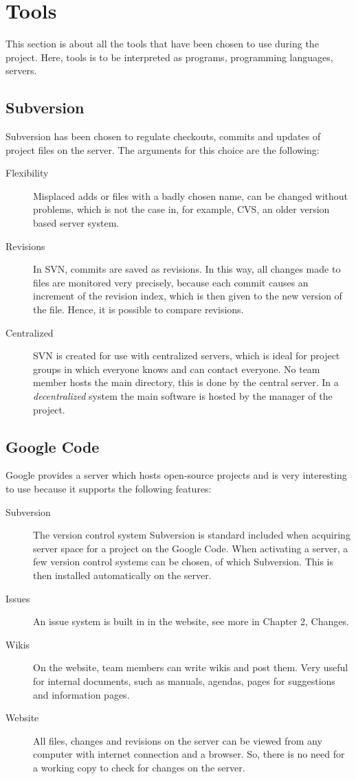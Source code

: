 \section{Tools}
This section is about all the tools that have been chosen to use during the project. Here, tools is to be interpreted as programs, programming languages, servers.

\subsection{Subversion}
Subversion has been chosen to regulate checkouts, commits and updates of project files on the server.
The arguments for this choice are the following:
\begin{description}
\item[Flexibility]
Misplaced adds or files with a badly chosen name, can be changed without problems, which is not the case in, for example, CVS, an older version based server system.
\item[Revisions]
In SVN, commits are saved as revisions.
In this way, all changes made to files are monitored very precisely, because each commit causes an increment of the revision index, which is then given to the new version of the file.
Hence, it is possible to compare revisions.
\item[Centralized]
SVN is created for use with centralized servers, which is ideal for project groups in which everyone knows and can contact everyone.
No team member hosts the main directory, this is done by the central server.
In a {\it decentralized} system the main software is hosted by the manager of the project.
\end{description}

\subsection{Google Code}
Google provides a server which hosts open-source projects and is very interesting to use because it supports the following features:
\begin{description}
\item[Subversion]
The version control system Subversion is standard included when acquiring server space for a project on the Google Code. When activating a server, a few version control systems can be chosen, of which Subversion. This is then installed automatically on the server.
\item[Issues]
An issue system is built in in the website, see more in Chapter 2, Changes.
\item[Wikis]
On the website, team members can write wikis and post them. Very useful for internal documents, such as manuals, agendas, pages for suggestions and information pages.
\item[Website]
All files, changes and revisions on the server can be viewed from any computer with internet connection and a browser. So, there is no need for a working copy to check for changes on the server.
\end{description}

